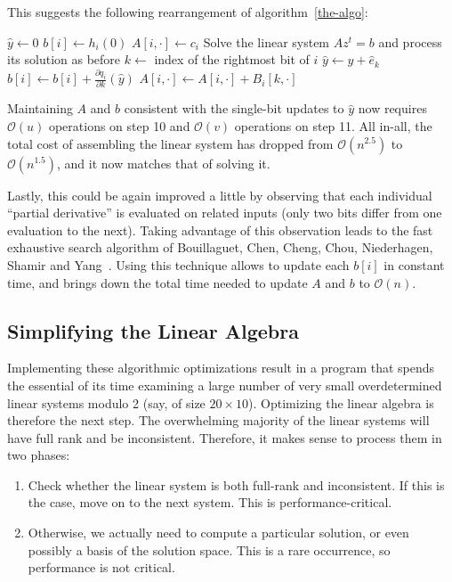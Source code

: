 \documentclass[a4paper,UKenglish,cleveref, autoref]{lipics-v2019}
\newcommand{\bigO}[1]{\ensuremath{\mathcal{O}\left( #1 \right)} }
\begin{document}
This suggests the following rearrangement of algorithm~\ref{the-algo}:

\begin{algorithmic}[1]
  \State $\hat y \gets 0$ 
  \State $b[i] \gets  h_i(0)$
  \State $A[i, \cdot] \gets c_i$
  \EndFor
   
  \State Solve the linear system $Az^t = b$ and process its solution as before
  \State $k \gets $ index of the rightmost bit of $i$ 
  \State $\hat y \gets \hat y + \hat e_k$
   
  \State $b[i] \gets b[i] + \frac{\partial q_i}{\partial k}(\hat y)$
  \State $A[i, \cdot] \gets A[i, \cdot] + B_i[k, \cdot]$
  \EndFor
  \EndFor
\end{algorithmic}

Maintaining $A$ and $b$ consistent with the single-bit updates to $\hat y$ now
requires $\bigO{u}$ operations on step 10 and $\bigO{v}$ operations on step
11. All in-all, the total cost of assembling the linear system has dropped from
$\bigO{n^{2.5}}$ to $\bigO{n^{1.5}}$, and it now matches that of solving it.

Lastly, this could be again improved a little by observing that each individual
``partial derivative'' is evaluated on related inputs (only two bits differ from
one evaluation to the next). Taking advantage of this observation leads to the
fast exhaustive search algorithm of Bouillaguet, Chen, Cheng, Chou, Niederhagen,
Shamir and Yang~\cite{BouillaguetCCCNSY10}. Using this technique allows to
update each $b[i]$ in constant time, and brings down the total time needed to
update $A$ and $b$ to $\bigO{n}$.

\subsection{Simplifying the Linear Algebra}

Implementing these algorithmic optimizations result in a program that spends the
essential of its time examining a large number of very small overdetermined
linear systems modulo 2 (say, of size $20 \times 10$). Optimizing the linear
algebra is therefore the next step. The overwhelming majority of the linear
systems will have full rank and be inconsistent. Therefore, it makes sense to
process them in two phases:
\begin{enumerate}
\item Check whether the linear system is both full-rank and inconsistent. If
  this is the case, move on to the next system. This is performance-critical.
\item Otherwise, we actually need to compute a particular solution, or even
  possibly a basis of the solution space. This is a rare occurrence, so
  performance is not critical.
\end{enumerate}
\end{document}
